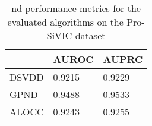 \begin{table}
\caption{\gls{nd} performance metrics for the evaluated algorithms on the Pro-SiVIC dataset}
\label{tab:results prosivic}
\begin{tabular}{|l|l|l|}
\hline
      & AUROC & AUPRC \\ \hline
DSVDD & 0.9215  & 0.9229  \\ \hline
GPND & 0.9488  & 0.9533  \\ \hline
ALOCC & 0.9243  & 0.9255  \\ \hline
\end{tabular}
\end{table}

